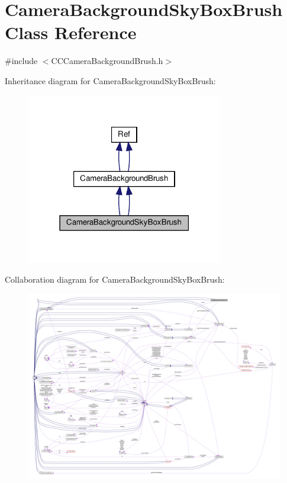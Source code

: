 \hypertarget{classCameraBackgroundSkyBoxBrush}{}\section{Camera\+Background\+Sky\+Box\+Brush Class Reference}
\label{classCameraBackgroundSkyBoxBrush}


{\ttfamily \#include $<$C\+C\+Camera\+Background\+Brush.\+h$>$}



Inheritance diagram for Camera\+Background\+Sky\+Box\+Brush\+:
\nopagebreak
\begin{figure}[H]
\begin{center}
\leavevmode
\includegraphics[width=243pt]{classCameraBackgroundSkyBoxBrush__inherit__graph}
\end{center}
\end{figure}


Collaboration diagram for Camera\+Background\+Sky\+Box\+Brush\+:
\nopagebreak
\begin{figure}[H]
\begin{center}
\leavevmode
\includegraphics[width=350pt]{classCameraBackgroundSkyBoxBrush__coll__graph}
\end{center}
\end{figure}
